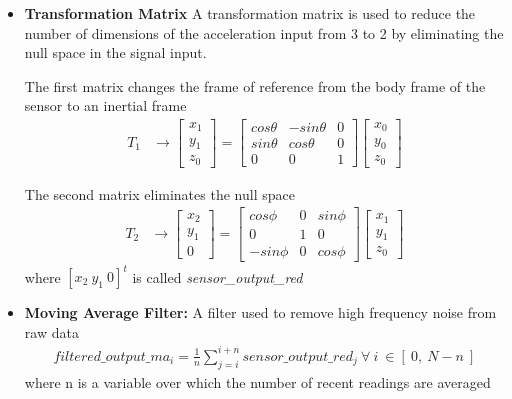 \documentclass[a4paper, oneside,11pt]{article}
\begin{document}
\begin{itemize}

	\item \textbf{Transformation Matrix}
		A transformation matrix is used to reduce the number of dimensions of the acceleration input from 3 to 2 by eliminating the null space in the signal input.

		The first matrix changes the frame of reference from the body frame of the sensor to an inertial frame
		\begin{eqnarray}
		T_1 & \rightarrow
		  \begin{bmatrix}
			x_1\\
			y_1\\
			z_0
		  \end{bmatrix}
		  =
		  \left[
		  \begin{matrix}
			cos \theta & -sin \theta & 0\\
			sin \theta & cos \theta & 0\\
			0 & 0 & 1
		  \end{matrix}
		  \right]
		  \left[
		  \begin{matrix}
			x_0\\
			y_0\\
			z_0
		  \end{matrix}
		  \right]
		\end{eqnarray}

		The second matrix eliminates the null space
		\begin{eqnarray}
		T_2 & \rightarrow
		  \begin{bmatrix}
			x_2\\
			y_1\\
			0
		  \end{bmatrix}
		  =
		  \left[
		  \begin{matrix}
			cos \phi & 0 & sin \phi \\
			0 & 1 & 0\\
			-sin \phi & 0 & cos \phi
		  \end{matrix}
		  \right]
		  \left[
		  \begin{matrix}
			x_1\\
			y_1\\
			z_0
		  \end{matrix}
		  \right]
		\end{eqnarray}
		where \begin{math}\left[x_2\ y_1\ 0\right]^t\end{math} is called \textit{sensor\_output\_red}

	\item \textbf{Moving Average Filter:}
		A filter used to remove high frequency noise from raw data
		\begin{eqnarray}
		   filtered\_output\_ma_i = \frac{1}{n} \sum_{j=i}^{i+n} sensor\_output\_red_j \ \forall \ i \ \in \left[ \  0,\ N - n \ \right]
		\end{eqnarray}
		where n is a variable over which the number of recent readings are averaged


\end{itemize}
\end{document}
